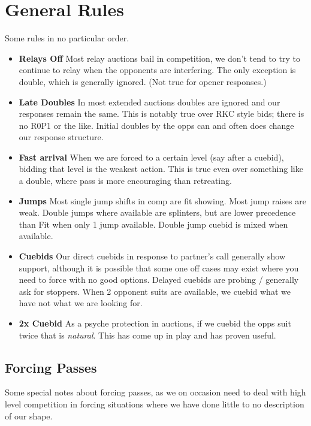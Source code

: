 \documentclass[tom-ari]{subfile}
\begin{document}
	
\chapter{General Rules}

Some rules in no particular order.

\begin{itemize}[]
\item \textbf{Relays Off} Most relay auctions bail in competition, we don't tend to try to continue to relay when the opponents are interfering. The only exception is double, which is generally ignored. (Not true for  opener responses.)
\item \textbf{Late Doubles} In most extended auctions doubles are ignored and our responses remain the same. This is notably true over RKC style bids; there is no R0P1 or the like. Initial doubles by the opps can and often does change our response structure.
\item \textbf{Fast arrival} When we are forced to a certain level (say after a cuebid), bidding that level is the weakest action. This is true even over something like a double, where pass is more encouraging than retreating.
\item \textbf{Jumps} Most single jump shifts in comp are fit showing. Most jump raises are weak. Double jumps where available are splinters, but are lower precedence than Fit when only 1 jump available. Double jump cuebid is mixed when available.
\item \textbf{Cuebids} Our direct cuebids in response to partner's call generally show support, although it is possible that some one off cases may exist where you need to force with no good options.  Delayed cuebids are probing / generally ask for stoppers. When 2 opponent suits are available, we cuebid what we have not what we are looking for.
\item \textbf{2x Cuebid} As a psyche protection in  auctions, if we cuebid the opps suit twice that is \textit{natural}. This has come up in play and has proven useful.
\end{itemize}

\section{Forcing Passes}

Some special notes about forcing passes, as we on occasion need to deal with high level competition in forcing situations where we have done little to no description of our shape.
\end{document}
